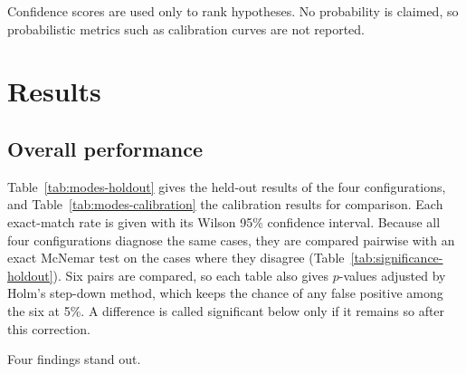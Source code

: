 Confidence scores are used only to rank hypotheses. No probability is claimed, so probabilistic metrics such as calibration curves are not reported.

\section{Results}
\label{sec:results}

\subsection{Overall performance}

Table~\ref{tab:modes-holdout} gives the held-out results of the four configurations, and Table~\ref{tab:modes-calibration} the calibration results for comparison. Each exact-match rate is given with its Wilson 95\% confidence interval. Because all four configurations diagnose the same cases, they are compared pairwise with an exact McNemar test on the cases where they disagree (Table~\ref{tab:significance-holdout}). Six pairs are compared, so each table also gives $p$-values adjusted by Holm's step-down method, which keeps the chance of any false positive among the six at 5\%. A difference is called significant below only if it remains so after this correction.





Four findings stand out.

